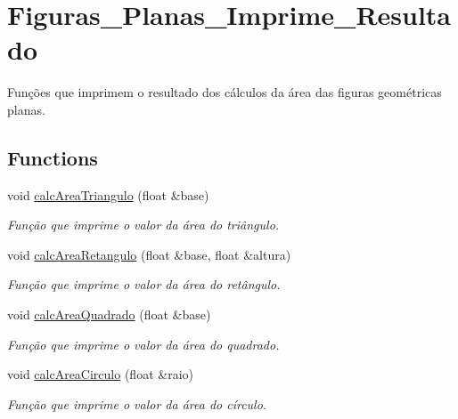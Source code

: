 \hypertarget{group__Figuras__Planas__Imprime__Resultado}{}\section{Figuras\+\_\+\+Planas\+\_\+\+Imprime\+\_\+\+Resultado}
\label{group__Figuras__Planas__Imprime__Resultado}


Funções que imprimem o resultado dos cálculos da área das figuras geométricas planas.  


\subsection*{Functions}
\begin{DoxyCompactItemize}
\item 
void \hyperlink{group__Figuras__Planas__Imprime__Resultado_gac0d6d9fb68ed0e43ad9780f0c86cac51}{calc\+Area\+Triangulo} (float \&base)
\begin{DoxyCompactList}\small\item\em Função que imprime o valor da área do triângulo. \end{DoxyCompactList}\item 
void \hyperlink{group__Figuras__Planas__Imprime__Resultado_ga1091311f26d5adb888dae930fc1ec7d6}{calc\+Area\+Retangulo} (float \&base, float \&altura)
\begin{DoxyCompactList}\small\item\em Função que imprime o valor da área do retângulo. \end{DoxyCompactList}\item 
void \hyperlink{group__Figuras__Planas__Imprime__Resultado_gaabb19ec0d92baa5524a15b463f854158}{calc\+Area\+Quadrado} (float \&base)
\begin{DoxyCompactList}\small\item\em Função que imprime o valor da área do quadrado. \end{DoxyCompactList}\item 
void \hyperlink{group__Figuras__Planas__Imprime__Resultado_gafc4965f40035f915dd29f3a2fe680339}{calc\+Area\+Circulo} (float \&raio)
\begin{DoxyCompactList}\small\item\em Função que imprime o valor da área do círculo. \end{DoxyCompactList}\end{DoxyCompactItemize}


